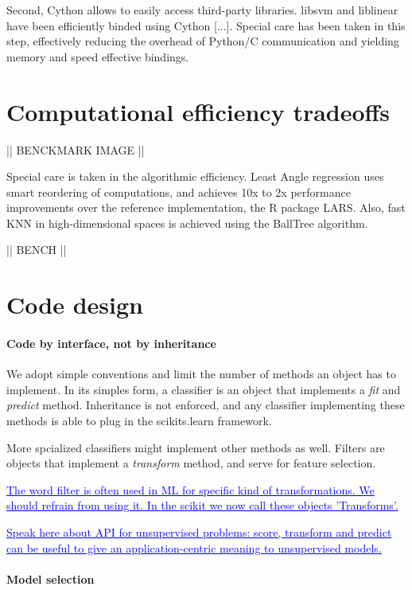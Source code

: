 \documentclass[twoside,11pt]{article}
\newcommand{\GAEL}[1]{\textcolor{blue}{\uline{#1}}}
\begin{document}
Second, Cython allows to easily access third-party libraries. libsvm
and liblinear have been efficiently binded using Cython [...]. Special
care has been taken in this step, effectively reducing the overhead of
Python/C communication and yielding memory and speed effective bindings.


\section{Computational efficiency tradeoffs}

|| BENCKMARK IMAGE ||


Special care is taken in the algorithmic efficiency. Least Angle
regression uses smart reordering of computations, and achieves 10x to
2x performance improvements over the reference implementation, the R
package LARS. Also, fast KNN in high-dimensional spaces is achieved
using the BallTree algorithm.

|| BENCH ||

\section{Code design}

\paragraph{Code by interface, not by inheritance}
%
We adopt simple conventions and limit the number of methods an object
has to implement. In its simples form, a classifier is an object that
implements a \emph{fit} and \emph{predict} method. Inheritance is not
enforced, and any classifier implementing these methods is able to
plug in the scikits.learn framework.


More spcialized classifiers might implement other methods as
well. Filters are objects that implement a \emph{transform} method,
and serve for feature selection.

\GAEL{The word filter is often used in ML for specific kind of
transformations. We should refrain from using it. In the scikit we now
call these objects 'Transforms'. }

\GAEL{Speak here about API for unsupervised problems: score, transform and
predict can be useful to give an application-centric meaning to
unsupervised models.}

\paragraph{Model selection}
\end{document}
